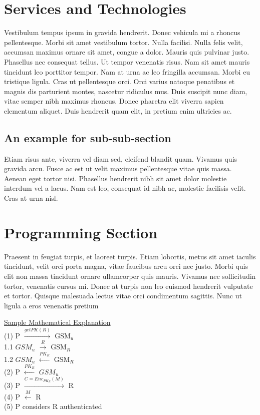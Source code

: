 \section{Services and Technologies}
Vestibulum tempus ipsum in gravida hendrerit. Donec vehicula mi a rhoncus pellentesque. Morbi sit amet vestibulum tortor. Nulla facilisi. Nulla felis velit, accumsan maximus ornare sit amet, congue a dolor. Mauris quis pulvinar justo. Phasellus nec consequat tellus. Ut tempor venenatis risus. Nam sit amet mauris tincidunt leo porttitor tempor. Nam at urna ac leo fringilla accumsan. Morbi eu tristique ligula. Cras ut pellentesque orci. Orci varius natoque penatibus et magnis dis parturient montes, nascetur ridiculus mus. Duis suscipit nunc diam, vitae semper nibh maximus rhoncus. Donec pharetra elit viverra sapien elementum aliquet. Duis hendrerit quam elit, in pretium enim ultricies ac.

\subsection{An example for sub-sub-section}
Etiam risus ante, viverra vel diam sed, eleifend blandit quam. Vivamus quis gravida arcu. Fusce ac est ut velit maximus pellentesque vitae quis massa. Aenean eget tortor nisi. Phasellus hendrerit nibh sit amet dolor molestie interdum vel a lacus. Nam est leo, consequat id nibh ac, molestie facilisis velit. Cras at urna nisl.

\section{Programming Section}

Praesent in feugiat turpis, et laoreet turpis. Etiam lobortis, metus sit amet iaculis tincidunt, velit orci porta magna, vitae faucibus arcu orci nec justo. Morbi quis elit non massa tincidunt ornare ullamcorper quis mauris. Vivamus nec sollicitudin tortor, venenatis cursus mi. Donec at turpis non leo euismod hendrerit vulputate et tortor. Quisque malesuada lectus vitae orci condimentum sagittis. Nunc ut ligula a eros venenatis pretium

\begin{center}
  \begin{parbox}[t]{.45\linewidth}
    {\textsf{\underline{Sample Mathematical Explanation} \\
      (1) P $\xrightarrow{getPK(R)}$ GSM$_u$ \\
      1.1 $GSM_u$ $\xrightarrow{R}$ GSM$_R$\\
      1.2 $GSM_u$ $\xleftarrow{PK_R}$ GSM$_R$\\
      (2) P $\xleftarrow{PK_R}$ $GSM_u$ \\
      (3) P $\xrightarrow{C=Enc_{PK_R}(M)}$ R \\
      (4) P $\xleftarrow{M}$ R \\
      (5) P considers R authenticated \\
      \hfill
    }} \\
  \end{parbox}
\end{center}
